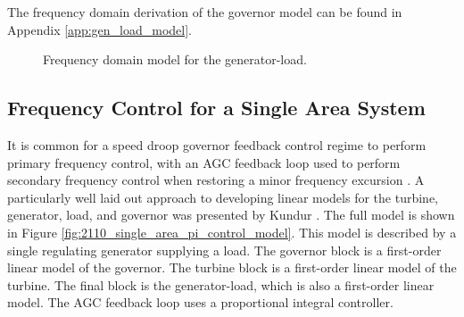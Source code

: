 The frequency domain derivation of the governor model can be found in Appendix \ref{app:gen_load_model}.

\begin{figure}[h]
	\centering
	
	\caption[Frequency domain model for generator-load]{Frequency domain model for the generator-load.}
	\label{fig:2109_generator_load_model}
\end{figure}



\subsection{Frequency Control for a Single Area System}\label{oneareapowersystem}
It is common for a speed droop governor feedback control regime to perform primary frequency control, with an AGC feedback loop used to perform secondary frequency control when restoring a minor frequency excursion \cite{Wood2013, Grainger1994, Kothari2011, Kundur1994}. A particularly well laid out approach to developing linear models for the turbine, generator, load, and governor was presented by Kundur \cite{Kundur1994}. The full model is shown in Figure \ref{fig:2110_single_area_pi_control_model}. This model is described by a single regulating generator supplying a load. The governor block is a first-order linear model of the governor. The turbine block is a first-order linear model of the turbine. The final block is the generator-load, which is also a first-order linear model. The AGC feedback loop uses a proportional integral controller.

\clearpage

\begin{sidewaysfigure}[ht]
\centering

\caption[Single power area with PI feedback control]{A classical feedback control approach for a single control area power system. The system is comprised of a first order models for both turbines, and generators. The governor controllers are also first order models. AGC is implemented using an integral control block in a feedback loop \cite{Kundur1994}.}
\label{fig:2110_single_area_pi_control_model}
\end{sidewaysfigure}

\clearpage



